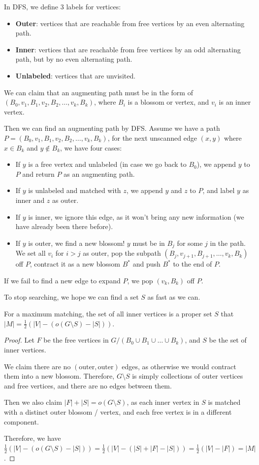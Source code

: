 In DFS, we define 3 labels for vertices:
\begin{itemize}
	\item \textbf{Outer}: vertices that are reachable from free vertices by an even alternating path.
	\item \textbf{Inner}: vertices that are reachable from free vertices by an odd alternating path, but by no even alternating path.
	\item \textbf{Unlabeled}: vertices that are unvisited.
\end{itemize}

We can claim that an augmenting path must be in the form of $(B_0, v_1, B_1, v_2, B_2, \dots, v_k, B_k)$, where $B_i$ is a blossom or vertex, and $v_i$ is an inner vertex.

Then we can find an augmenting path by DFS. Assume we have a path $P = (B_0, v_1, B_1, v_2, B_2, \dots, v_k, B_k)$, for the next unscanned edge $(x,y)$ where $x\in B_k$ and $y\not\in B_k$, we have four cases:
\begin{itemize}
	\item If $y$ is a free vertex and unlabeled (in case we go back to $B_0$), we append $y$ to $P$ and return $P$ as an augmenting path.
	\item If $y$ is unlabeled and matched with $z$, we append $y$ and $z$ to $P$, and label $y$ as inner and $z$ as outer.
	\item If $y$ is inner, we ignore this edge, as it won't bring any new information (we have already been there before).
	\item If $y$ is outer, we find a new blossom! $y$ must be in $B_j$ for some $j$ in the path. We set all $v_i$ for $i > j$ as outer, pop the subpath $(B_j, v_{j+1}, B_{j+1}, \dots, v_k, B_k)$ off $P$, contract it as a new blossom $B^*$ and push $B^*$ to the end of $P$.
\end{itemize}

If we fail to find a new edge to expand $P$, we pop $(v_k, B_k)$ off $P$.

To stop searching, we hope we can find a set $S$ as fast as we can.

\begin{theorem}
	For a maximum matching, the set of all inner vertices is a proper set $S$ that $|M| = \frac{1}{2}(|V| - (o(G\setminus S)-|S|))$.
\end{theorem}
\begin{proof}
	Let $F$ be the free vertices in $G/(B_0\cup B_1\cup \dots \cup B_k)$, and $S$ be the set of inner vertices.

	We claim there are no $(\text{outer}, \text{outer})$ edges, as otherwise we would contract them into a new blossom. Therefore, $G\setminus S$ is simply collections of outer vertices and free vertices, and there are no edges between them.

	Then we also claim $|F| + |S| = o(G\setminus S)$, as each inner vertex in $S$ is matched with a distinct outer blossom / vertex, and each free vertex is in a different component.

	Therefore, we have $\frac{1}{2}(|V| - (o(G\setminus S)-|S|)) = \frac{1}{2}(|V| - (|S| + |F| - |S|)) = \frac{1}{2}(|V| - |F|) = |M|$.
\end{proof}

